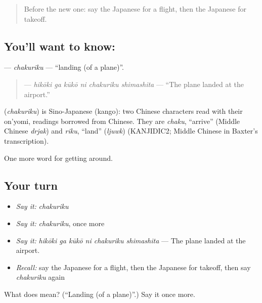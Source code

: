 \begin{quote}
Before the new one: say the Japanese for a flight, then the Japanese for takeoff.
\end{quote}

\subsection*{You'll want to know: }
\textbf{} — \emph{chakuriku} — \textquotedblleft{}landing (of a plane)\textquotedblright{}.

\begin{quote}
\textbf{  } — \emph{hikōki ga kūkō ni chakuriku shimashita} — \textquotedblleft{}The plane landed at the airport.\textquotedblright{}
\end{quote}

\begin{cousinweb}
\textbf{} (\emph{chakuriku}) is Sino-Japanese (kango): two Chinese characters read with their on'yomi, readings borrowed from Chinese. They are \emph{chaku}, \textquotedblleft{}arrive\textquotedblright{} (Middle Chinese \emph{drjak}) and \emph{riku}, \textquotedblleft{}land\textquotedblright{} (\emph{ljuwk}) (KANJIDIC2; Middle Chinese in Baxter's transcription).
\end{cousinweb}

\begin{grammarlens}[title={What you've built}]
One more word for getting around.
\end{grammarlens}

\subsection*{Your turn}
\begin{itemize}
\raggedright
  \item \emph{Say it:} \emph{chakuriku}
  \item \emph{Say it:} \emph{chakuriku}, once more
  \item \emph{Say it:} \emph{hikōki ga kūkō ni chakuriku shimashita} — The plane landed at the airport.
  \item \emph{Recall:} say the Japanese for a flight, then the Japanese for takeoff, then say \emph{chakuriku} again
\end{itemize}

\begin{tcolorbox}[breakable,colback=teal!4,colframe=teal!35!black,title={Before you move on}]
What does  mean? (\textquotedblleft{}Landing (of a plane)\textquotedblright{}.) Say it once more.
\end{tcolorbox}
